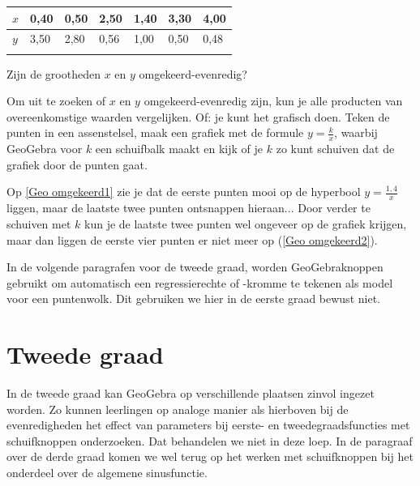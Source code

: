 \begin{multicols}{2}
\begin{tabel}
		\begin{tabular}{m{0.8cm} C{0.8cm} C{0.8cm} C{0.8cm} C{0.8cm}C{0.8cm}C{0.8cm}  }  
			\hlinethick

			$x$ & 0,40 & 0,50 & 2,50&1,40&3,30&4,00  \\
            \hline
   			$y$ & 3,50&2,80&0,56&1,00&0,50&0,48\\
		
			\hlinethick
		\end{tabular}
  \caption{Zijn de grootheden $x$ en $y$ omgekeerd-evenredig?}
  \label{tab:Omgekeerd}
  
	\end{tabel}

Om uit te zoeken of $x$ en $y$ omgekeerd-evenredig zijn, kun je  alle producten van overeenkomstige waarden vergelijken. Of: je kunt het grafisch doen. Teken de punten in een assenstelsel, maak een grafiek met de formule $y=\frac{k}{x}$, waarbij GeoGebra voor $k$ een schuifbalk maakt en kijk of je $k$ zo kunt schuiven dat de grafiek door de punten gaat.  


Op \autoref{Geo omgekeerd1} zie je dat de eerste punten mooi op de hyperbool $y=\frac{1,4}{x}$ liggen, maar de laatste twee punten ontsnappen hieraan... Door verder te schuiven met $k$ kun je de laatste twee punten  wel ongeveer op de grafiek krijgen, maar dan liggen de eerste vier punten er niet meer op (\autoref{Geo omgekeerd2}).

In de volgende paragrafen voor de tweede graad, worden GeoGebraknoppen gebruikt om automatisch een regressierechte of -kromme te tekenen als model voor een puntenwolk. Dit gebruiken we hier in de eerste graad bewust niet.
    

 \section{Tweede graad}



In de tweede graad kan GeoGebra op verschillende plaatsen zinvol ingezet worden. Zo kunnen leerlingen op analoge manier als hierboven bij de evenredigheden het effect van parameters bij eerste- en tweedegraadsfuncties met schuifknoppen onderzoeken. Dat behandelen we niet in deze loep. In de paragraaf over de derde graad komen we wel terug op het werken met schuifknoppen bij het onderdeel over de algemene sinusfunctie.


\end{multicols}
